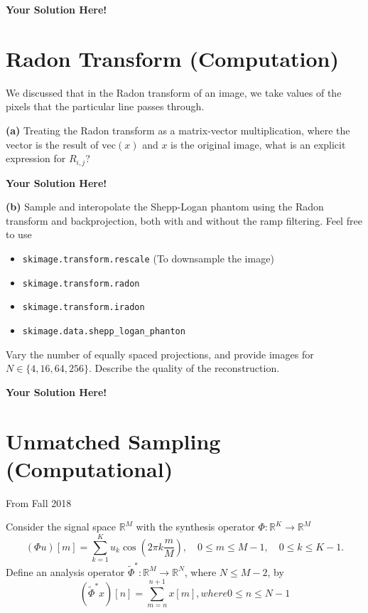 \documentclass[12pt]{article}
\newcommand{\0}{\mathbf{0}}
\newcommand{\1}{\mathbf{1}}
\newcommand{\solspace}{\vspace{3mm} \textbf{Your Solution Here!} \vspace{3mm}}
\begin{document}
\solspace

\pagebreak
\section{Radon Transform (Computation)}
We discussed that in the Radon transform of an image, we take values of the pixels that the particular line passes through.

\textbf{(a)}
Treating the Radon transform as a matrix-vector multiplication, where the vector is the result of $\text{vec}(x)$ and $x$ is the original image, what is an explicit expression for $R_{i,j}$?

\solspace

\textbf{(b)}
Sample and interopolate the Shepp-Logan phantom using the Radon transform and backprojection, both with and without the ramp filtering. Feel free to use
\begin{itemize}
    \item \verb|skimage.transform.rescale| (To downsample the image)\vspace*{-4mm}
    \item \verb|skimage.transform.radon|\vspace*{-4mm}
    \item \verb|skimage.transform.iradon|\vspace*{-4mm}
    \item \verb|skimage.data.shepp_logan_phanton|
\end{itemize}

Vary the number of equally spaced projections, and provide images for $N \in \{4,16,64,256\}$. Describe the quality of the reconstruction.

\solspace

\pagebreak

\section{Unmatched Sampling (Computational)}
From Fall 2018

Consider the signal space $\mathbb{R}^M$ with the synthesis operator $\Phi: \mathbb{R}^K \rightarrow \mathbb{R}^M$
\begin{equation}
    (\Phi u)[m] = \sum_{k=1}^K u_k \cos(2\pi k \frac{m}{M}), \quad 0 \leq m \leq M-1, \quad 0 \leq k \leq K-1.
\end{equation}
Define an analysis operator $\tilde \Phi^*: \mathbb{R}^M \rightarrow \mathbb{R}^N$, where $N \leq M-2$, by
\begin{equation}
    (\tilde \Phi^* x)[n] = \sum_{m=n}^{n+1}x[m], where 0 \leq n \leq N-1
\end{equation}
\end{document}
